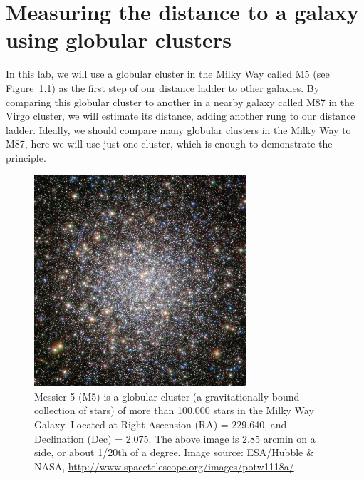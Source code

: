 \chapter{Measuring the distance to a galaxy using globular clusters}



In this lab, we will use a globular cluster in the Milky Way called M5 (see Figure~\ref{gc:fig:m5}) as the first step of our distance
ladder to other galaxies. By comparing this globular cluster to another in a nearby galaxy
called M87 in the Virgo cluster, we will estimate its distance, adding another rung to our
distance ladder. Ideally, we should compare many globular clusters in the Milky Way to
M87, here we will use just one cluster, which is enough to demonstrate the principle.

\begin{figure}
	\centering
	\includegraphics[width=0.7\textwidth]{globular-cluster/potw1118a}
	\caption{Messier 5 (M5) is a globular cluster (a gravitationally bound collection
		of stars) of more than 100,000 stars in the Milky Way Galaxy. Located at Right
		Ascension (RA) = 229.640\textdegree, and Declination (Dec) = 2.075\textdegree.
		The above
		image is 2.85 arcmin on a side, or about 1/20th of a degree.
		Image source: ESA/Hubble \& NASA, \url{http://www.spacetelescope.org/images/potw1118a/}}\label{gc:fig:m5}
\end{figure}

